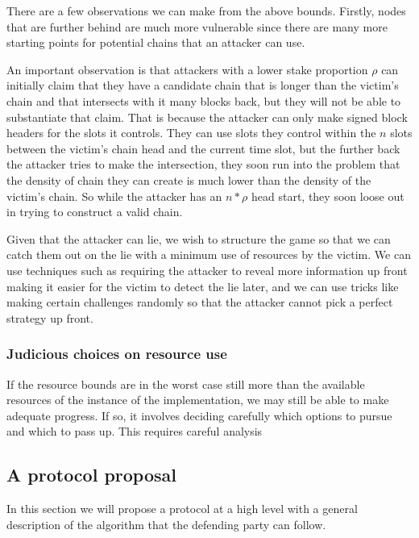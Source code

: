 \documentclass{article}
\theoremstyle{definition}{
  \newtheorem{lemma}{Lemma}[section] %
  \newtheorem{definition}[lemma]{Definition}
}
\theoremstyle{theorem}{
  \newtheorem{invariant}[lemma]{Invariant}
  \newtheorem{proofobligation}[lemma]{Proof Obligation}
}
\numberwithin{equation}{lemma}
\begin{document}
There are a few observations we can make from the above bounds. Firstly,
nodes that are further behind are much more vulnerable since there are many
more starting points for potential chains that an attacker can use.

An important observation is that attackers with a lower stake proportion $\rho$
can initially claim that they have a candidate chain that is longer than the
victim's chain and that intersects with it many blocks back, but they will not
be able to substantiate that claim. That is because the attacker can only make
signed block headers for the slots it controls. They can use slots they control
within the $n$ slots between the victim's chain head and the current time slot,
but the further back the attacker tries to make the intersection, they soon
run into the problem that the density of chain they can create is much lower
than the density of the victim's chain. So while the attacker has an $n * \rho$
head start, they soon loose out in trying to construct a valid chain.

Given that the attacker can lie, we wish to structure the game so that we can
catch them out on the lie with a minimum use of resources by the victim. We can
use techniques such as requiring the attacker to reveal more information up
front making it easier for the victim to detect the lie later, and we can use
tricks like making certain challenges randomly so that the attacker cannot pick
a perfect strategy up front.

\subsubsection{Judicious choices on resource use}

If the resource bounds are in the worst case still more than the available
resources of the instance of the implementation, we may still be able to
make adequate progress. If so, it involves deciding carefully which options
to pursue and which to pass up. This requires careful analysis 

\subsection{A protocol proposal}

In this section we will propose a protocol at a high level with a general
description of the algorithm that the defending party can follow.
\end{document}
